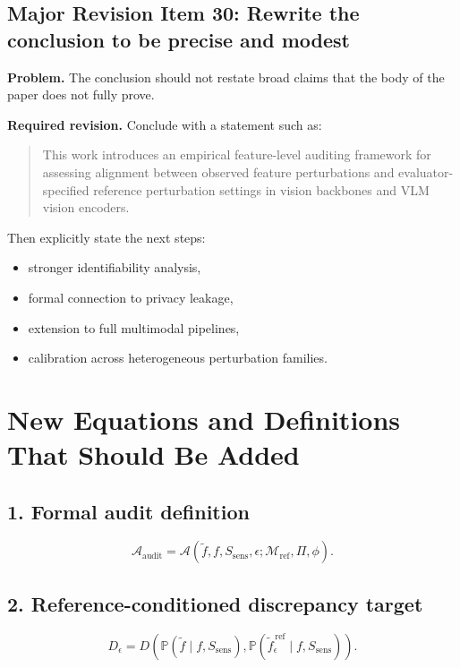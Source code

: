 \subsection*{Major Revision Item 30: Rewrite the conclusion to be precise and modest}
\textbf{Problem.} The conclusion should not restate broad claims that the body of the paper does not fully prove.

\textbf{Required revision.}
Conclude with a statement such as:
\begin{quote}
This work introduces an empirical feature-level auditing framework for assessing alignment between observed feature perturbations and evaluator-specified reference perturbation settings in vision backbones and VLM vision encoders.
\end{quote}

Then explicitly state the next steps:
\begin{itemize}
    \item stronger identifiability analysis,
    \item formal connection to privacy leakage,
    \item extension to full multimodal pipelines,
    \item calibration across heterogeneous perturbation families.
\end{itemize}

\section{New Equations and Definitions That Should Be Added}

\subsection*{1. Formal audit definition}
\begin{equation}
\mathcal{A}_{\text{audit}}
=
\mathcal{A}\!\left(
\tilde{f}, f, S_{\mathrm{sens}}, \epsilon ; \mathcal{M}_{\mathrm{ref}}, \Pi, \phi
\right).
\end{equation}

\subsection*{2. Reference-conditioned discrepancy target}
\begin{equation}
D_\epsilon
=
D\!\left(
\mathbb{P}(\tilde{f}\mid f,S_{\mathrm{sens}}),
\mathbb{P}(\tilde{f}^{\,\mathrm{ref}}_{\epsilon}\mid f,S_{\mathrm{sens}})
\right).
\end{equation}

